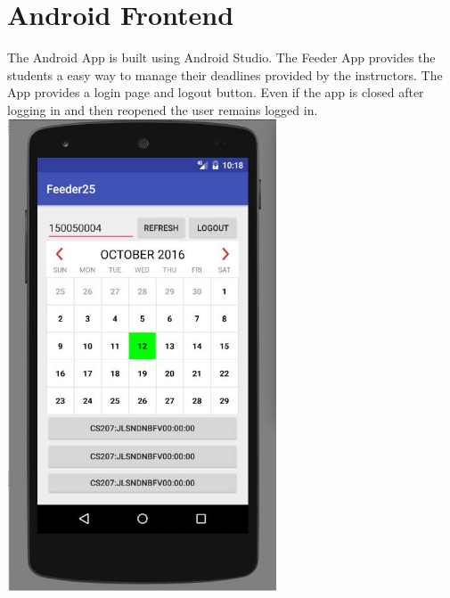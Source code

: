 \documentclass{article}
\begin{document}
\section{Android Frontend}
	The Android App is built using Android Studio. The Feeder App provides the students a easy way to manage their deadlines provided by the instructors. The App provides a login page and logout button. Even if the app is closed after logging in and then reopened the user remains logged in.
\\
\hfill \break
\includegraphics[width=8cm, height=14cm]{photos/android.png}
\newpage
\end{document}
